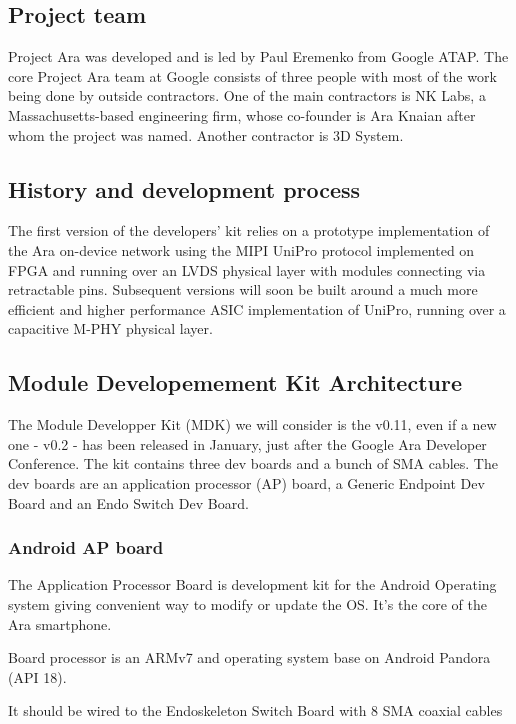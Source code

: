 \subsection{Project team}

Project Ara was developed and is led by Paul Eremenko from Google ATAP. The core Project Ara team at Google consists of three people with most of the work being done by outside contractors. One of the main contractors is NK Labs, a Massachusetts-based engineering firm, whose co-founder is Ara Knaian after whom the project was named. Another contractor is 3D System.

\subsection{History and development process}

The first version of the developers' kit relies on a prototype implementation of the Ara on-device network using the MIPI UniPro protocol implemented on FPGA and running over an LVDS physical layer with modules connecting via retractable pins. Subsequent versions will soon be built around a much more efficient and higher performance ASIC implementation of UniPro, running over a capacitive M-PHY physical layer.
         
\subsection{Module Developemement Kit Architecture}

The Module Developper Kit (MDK) we will consider is the v0.11, even if a new one - v0.2 - has been released in January, just after the Google Ara Developer Conference.
The kit contains three dev boards and a bunch of SMA cables. The dev boards are an application processor (AP) board, a Generic Endpoint Dev Board and an Endo Switch Dev Board.

\subsubsection{Android AP board}

The Application Processor Board is development kit for the Android Operating system giving convenient way to modify or update the OS. It's the core of the Ara smartphone.

Board processor is an ARMv7 and operating system base on Android Pandora (API 18).

It should be wired to the Endoskeleton Switch Board with 8 SMA coaxial cables


